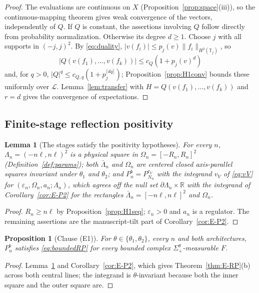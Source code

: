 \documentclass[11pt]{article}
\theoremstyle{plain}
\newtheorem{proposition}[theorem]{Proposition}
\newtheorem{lemma}[theorem]{Lemma}
\theoremstyle{definition}
\theoremstyle{remark}
\newcommand{\R}{\mathbb{R}}
\newcommand{\T}{\mathbb{T}}
\newcommand{\cL}{\mathcal{L}}
\begin{document}
\begin{proof}
The evaluations are continuous on $X$ (Proposition~\ref{prop:space}(iii)),
so the continuous-mapping theorem gives weak convergence of the vectors,
independently of $Q$. If $Q$ is constant, the assertions involving $Q$
follow directly from probability normalization. Otherwise its degree
$d\ge1$. Choose $j$ with all supports
in $(-j,j)^{2}$. By \eqref{eq:duality},
$|v(f_i)|\le p_j(v)\|f_i\|_{H^{2}(\T_j)}$, so
\[
|Q(v(f_1),\dots,v(f_k))|\le c_Q(1+p_j(v)^{d})
\]
and, for
$q>0$, $|Q|^{q}\le c_{Q,q}(1+p_j^{\lceil dq\rceil})$; Proposition~\ref{prop:H1conv} bounds these
uniformly over $\cL$. Lemma~\ref{lem:transfer} with
$H=Q(v(f_1),\dots,v(f_k))$ and $r=d$ gives the convergence of expectations.
\end{proof}

\subsection{Finite-stage reflection positivity}

\begin{lemma}[The stages satisfy the positivity hypotheses]\label{lem:RPmatch}
For every $n$, $\Lambda_n=(-n\ell,n\ell)^{2}$ is a physical square in $\Omega_n=[-R_n,R_n]^{2}$
(Definition~\ref{def:params}); both $\bar\Lambda_n$ and $\Omega_n$ are centered closed
axis-parallel squares invariant under $\theta_1$ and $\theta_2$; and
$P^{b}_{n}=P^{v_V}_{N_n}$ with the integrand $v_V$ of \eqref{eq:vV} for
$(\varepsilon_n,\Omega_n,a_n;\Lambda_n)$, which agrees off the null set $\partial\Lambda_n\times\R$ with the integrand
of Corollary~\ref{cor:E-P2} for the rectangles $\bar\Lambda_n=[-n\ell,n\ell]^{2}$ and $\Omega_n$.
\end{lemma}

\begin{proof}
$R_n\ge n\ell$ by Proposition~\ref{prop:H1seq}; $\varepsilon_n>0$ and $a_n$ is a regulator. The
remaining assertions are the manuscript-tilt part of Corollary~\ref{cor:E-P2}.
\end{proof}

\begin{proposition}[Clause (E1)]\label{prop:H1RP}
For $\theta\in\{\theta_1,\theta_2\}$, every $n$ and both architectures, $P^{b}_{n}$ satisfies
\eqref{eq:boundedRP} for every bounded complex $\Sigma^{\theta}_{+}$-measurable $F$.
\end{proposition}

\begin{proof}
Lemma~\ref{lem:RPmatch} and Corollary~\ref{cor:E-P2}, which gives
Theorem~\ref{thm:E-RP}(b) across both central lines; the integrand is
$\theta$-invariant because both the inner square and the outer square are.
\end{proof}
\end{document}
